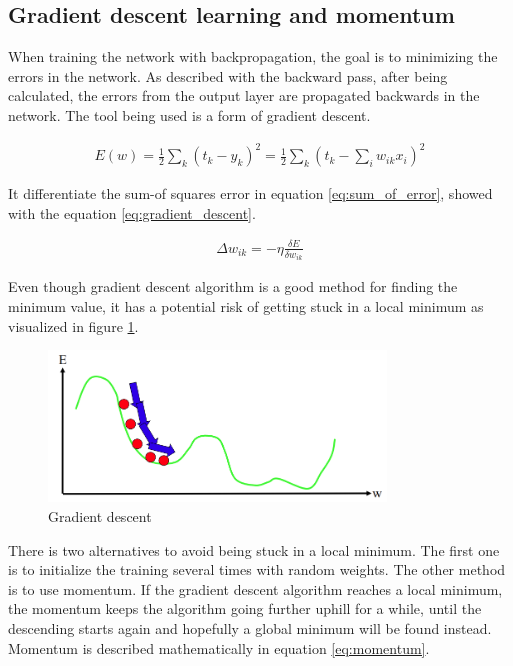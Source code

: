 \documentclass[USenglish]{ifimaster}  %
\begin{document}
\subsection{Gradient descent learning and momentum}
When training the network with backpropagation, the goal is to minimizing the errors in the network. As described with the backward pass, after being calculated, the errors from the output layer are propagated backwards in the network. The tool being used is a form of gradient descent. 

\begin{equation}\label{eq:sum_of_error}
\begin{aligned}
E(w) = \frac{1}{2} \sum_{k}(t_k - y_k)^2 = \frac{1}{2}\sum_{k}(t_k - \sum_{i} w_{ik}x_i)^2
\end{aligned}
\end{equation}

It differentiate the sum-of squares error in equation \cref{eq:sum_of_error}, showed with the equation \cref{eq:gradient_descent}.  

\begin{equation}\label{eq:gradient_descent}
\begin{aligned}
\Delta w_{ik} = -\eta\frac{\delta E}{\delta w_{ik}}
\end{aligned}
\end{equation}

Even though gradient descent algorithm is a good method for finding the minimum value, it has a potential risk of getting stuck in a local minimum as visualized in figure \cref{fig:gradient_descent}.

\begin{figure}[ht]
    \centering
    \includegraphics[width=0.8\textwidth]{bilder/gradient_descent.png}
    \caption{Gradient descent \cite{website:inf_4490_mlp}}
    \label{fig:gradient_descent}
\end{figure}

There is two alternatives to avoid being stuck in a local minimum. The first one is to initialize the training several times with random weights. The other method is to use momentum. If the gradient descent algorithm reaches a local minimum, the momentum keeps the algorithm going further uphill for a while, until the descending starts again and hopefully a global minimum will be found instead. Momentum is described mathematically in equation \cref{eq:momentum}. 
\end{document}
